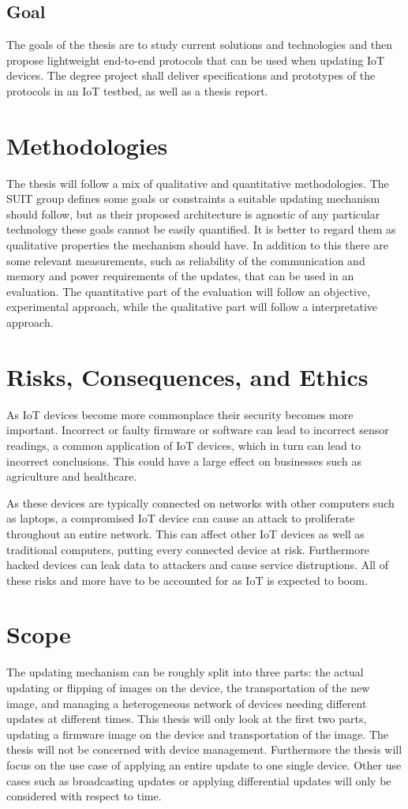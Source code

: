 \documentclass[0-thesis.tex]{subfiles}
\begin{document}
\subsection{Goal}
The goals of the thesis are to study current solutions and technologies and then propose
lightweight end-to-end protocols that can be used when updating IoT devices. The degree
project shall deliver specifications and prototypes of the protocols in an IoT testbed, as
well as a thesis report.

\section{Methodologies}
The thesis will follow a mix of qualitative and quantitative methodologies. The SUIT group
defines some goals or constraints a suitable updating mechanism should follow, but as
their proposed architecture is agnostic of any particular technology these goals cannot be
easily quantified. It is better to regard them as qualitative properties the mechanism
should have. In addition to this there are some relevant measurements, such as reliability
of the communication and memory and power requirements of the updates, that can be used in
an evaluation. The quantitative part of the evaluation will follow an objective,
experimental approach, while the qualitative part will follow a interpretative approach.

\section{Risks, Consequences, and Ethics}
As IoT devices become more commonplace their security becomes more important. Incorrect or
faulty firmware or software can lead to incorrect sensor readings, a common application of
IoT devices, which in turn can lead to incorrect conclusions. This could have a large
effect on businesses such as agriculture and healthcare.

As these devices are typically connected on networks with other computers such as laptops,
a compromised IoT device can cause an attack to proliferate throughout an entire network.
This can affect other IoT devices as well as traditional computers, putting every
connected device at risk. Furthermore hacked devices can leak data to attackers and cause
service distruptions. All of these risks and more have to be accounted for as IoT is
expected to boom.

\section{Scope}
The updating mechanism can be roughly split into three parts: the actual updating or
flipping of images on the device, the transportation of the new image, and managing a
heterogeneous network of devices needing different updates at different times. This thesis
will only look at the first two parts, updating a firmware image on the device and
transportation of the image. The thesis will not be concerned with device management.
Furthermore the thesis will focus on the use case of applying an entire update to one
single device. Other use cases such as broadcasting updates or applying differential
updates will only be considered with respect to time.
\end{document}
